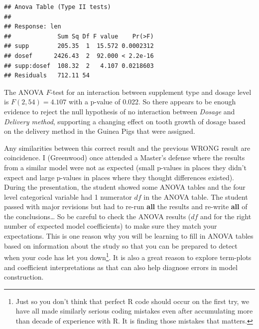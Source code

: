 \documentclass[]{book}
\newenvironment{Shaded}{\begin{snugshade}}{\end{snugshade}}
\newcommand{\KeywordTok}[1]{\textcolor[rgb]{0.13,0.29,0.53}{\textbf{#1}}}
\newcommand{\DataTypeTok}[1]{\textcolor[rgb]{0.13,0.29,0.53}{#1}}
\newcommand{\StringTok}[1]{\textcolor[rgb]{0.31,0.60,0.02}{#1}}
\newcommand{\OperatorTok}[1]{\textcolor[rgb]{0.81,0.36,0.00}{\textbf{#1}}}
\newcommand{\NormalTok}[1]{#1}
\let\rmarkdownfootnote\footnote%
\def\footnote{\protect\rmarkdownfootnote}
\theoremstyle{definition}
\theoremstyle{definition}
\theoremstyle{remark}
\begin{document}
\begin{Shaded}
\end{Shaded}

\begin{verbatim}
## Anova Table (Type II tests)
## 
## Response: len
##             Sum Sq Df F value    Pr(>F)
## supp        205.35  1  15.572 0.0002312
## dosef      2426.43  2  92.000 < 2.2e-16
## supp:dosef  108.32  2   4.107 0.0218603
## Residuals   712.11 54
\end{verbatim}

The ANOVA \(F\)-test for an interaction between supplement type and
dosage level is \(F(2,54)= 4.107\) with a p-value of 0.022. So there
appears to be enough evidence to reject the null hypothesis of no
interaction between \emph{Dosage} and \emph{Delivery method}, supporting
a changing effect on tooth growth of dosage based on the delivery method
in the Guinea Pigs that were assigned.

Any similarities between this correct result and the previous WRONG
result are coincidence. I (Greenwood) once attended a Master's defense
where the results from a similar model were not as expected (small
p-values in places they didn't expect and large p-values in places where
they thought differences existed). During the presentation, the student
showed some ANOVA tables and the four level categorical variable had 1
numerator \(df\) in the ANOVA table. The student passed with major
revisions but had to re-run \textbf{all} the results and re-write
\textbf{all} of the conclusions\ldots{} So be careful to check the ANOVA
results (\(df\) and for the right number of expected model coefficients)
to make sure they match your expectations. This is one reason why you
will be learning to fill in ANOVA tables based on information about the
study so that you can be prepared to detect when your code has let you
down\footnote{Just so you don't think that perfect R code should occur
  on the first try, we have all made similarly serious coding mistakes
  even after accumulating more than decade of experience with R. It is
  finding those mistakes that matters.}. It is also a great reason to
explore term-plots and coefficient interpretations as that can also help
diagnose errors in model construction.
\end{document}

